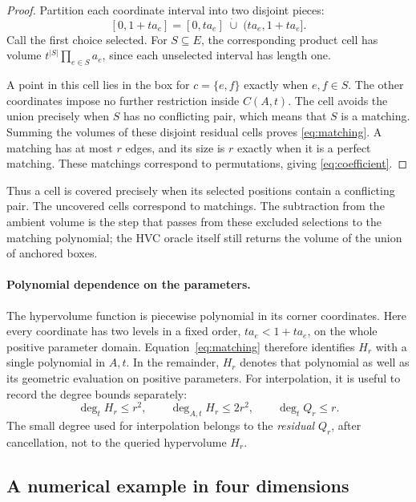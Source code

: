 \documentclass[12pt,a4paper]{article}
\theoremstyle{definition}
\theoremstyle{remark}
\begin{document}
\begin{proof}
Partition each coordinate interval into two disjoint pieces:
\[
 [0,1+ta_e]=[0,ta_e]\;\dot\cup\;(ta_e,1+ta_e].
\]
Call the first choice selected. For $S\subseteq E$, the corresponding
product cell has volume $t^{|S|}\prod_{e\in S}a_e$, since each unselected
interval has length one.

A point in this cell lies in the box for $c=\{e,f\}$ exactly when
$e,f\in S$. The other coordinates impose no further restriction inside
$C(A,t)$. The cell avoids the union precisely when $S$ has no conflicting
pair, which means that $S$ is a matching. Summing the volumes of these
disjoint residual cells proves \eqref{eq:matching}. A matching has at
most $r$ edges, and its size is $r$ exactly when it is a perfect
matching. These matchings correspond to permutations, giving
\eqref{eq:coefficient}.
\end{proof}

Thus a cell is covered precisely when its selected positions contain
a conflicting pair. The uncovered cells correspond to matchings.
The subtraction from the ambient volume is the step that passes from
these excluded selections to the matching polynomial; the HVC oracle
itself still returns the volume of the union of anchored boxes.

\paragraph{Polynomial dependence on the parameters.}
The hypervolume function is piecewise polynomial in its corner coordinates.
Here every coordinate has two levels in a fixed order,
$ta_e<1+ta_e$, on the whole positive parameter domain.
Equation~\eqref{eq:matching} therefore identifies $H_r$ with a single
polynomial in $A,t$. In the remainder, $H_r$ denotes that
polynomial as well as its geometric evaluation on positive parameters.
For interpolation, it is useful to record the degree bounds separately:
\begin{equation}
 \deg_t H_r\le r^2,\qquad \deg_{A,t}H_r\le2r^2,
 \qquad \deg_t Q_r\le r.
 \label{eq:degrees}
\end{equation}
The small degree used for interpolation belongs to the \emph{residual}
$Q_r$, after cancellation, not to the queried hypervolume $H_r$.

\subsection{A numerical example in four dimensions}
\end{document}
